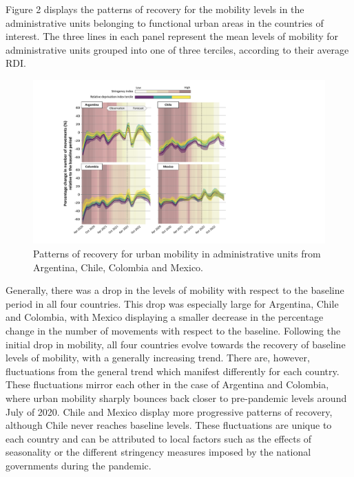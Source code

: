 \documentclass[
  11pt,
]{article}
\begin{document}
Figure 2 displays the patterns of recovery for the mobility levels in
the administrative units belonging to functional urban areas in the
countries of interest. The three lines in each panel represent the mean
levels of mobility for administrative units grouped into one of three
terciles, according to their average RDI.

\begin{figure}

{\centering \includegraphics{figures/prediction-rdi-band.pdf}

}

\caption{Patterns of recovery for urban mobility in administrative units
from Argentina, Chile, Colombia and Mexico.}

\end{figure}

Generally, there was a drop in the levels of mobility with respect to
the baseline period in all four countries. This drop was especially
large for Argentina, Chile and Colombia, with Mexico displaying a
smaller decrease in the percentage change in the number of movements
with respect to the baseline. Following the initial drop in mobility,
all four countries evolve towards the recovery of baseline levels of
mobility, with a generally increasing trend. There are, however,
fluctuations from the general trend which manifest differently for each
country. These fluctuations mirror each other in the case of Argentina
and Colombia, where urban mobility sharply bounces back closer to
pre-pandemic levels around July of 2020. Chile and Mexico display more
progressive patterns of recovery, although Chile never reaches baseline
levels. These fluctuations are unique to each country and can be
attributed to local factors such as the effects of seasonality or the
different stringency measures imposed by the national governments during
the pandemic.
\end{document}
